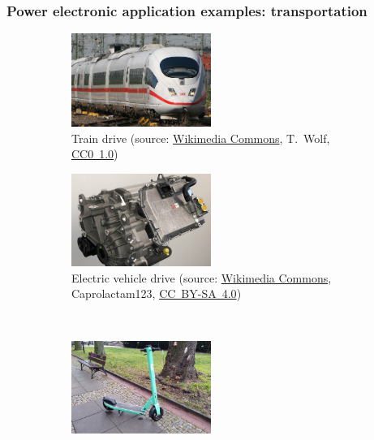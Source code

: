 \begin{frame}[c]
	\frametitle{Power electronic application examples: transportation}
	\begin{figure}
		\centering
		\begin{subfigure}[b]{0.49\textwidth}
			\centering
			\includegraphics[width=0.5\textwidth]{fig/lec01/ICE.jpg}
			\caption{Train drive (source: \href{hhttps://commons.wikimedia.org/wiki/File:DB_AG_406_001-8.jpg}{Wikimedia Commons}, T.~Wolf, \href{https://creativecommons.org/publicdomain/zero/1.0/}{CC0~1.0})}
		\end{subfigure}
		\pause
		\hfill
		\begin{subfigure}[b]{0.49\textwidth}
			\centering
			\includegraphics[width=0.5\textwidth]{fig/lec01/Drive.jpg}
			\caption{Electric vehicle drive (source: \href{https://commons.wikimedia.org/wiki/File:Vitesco_Technologies_EMR3.jpg}{Wikimedia Commons}, Caprolactam123, \href{https://creativecommons.org/licenses/by-sa/4.0/deed.en}{CC~BY-SA~4.0})}
		\end{subfigure}
		\pause
		\\
		\begin{subfigure}[b]{0.49\textwidth}
			\centering
			\includegraphics[width=0.5\textwidth]{fig/lec01/Scooter.jpg}

\end{subfigure}
\end{figure}
\end{frame}
